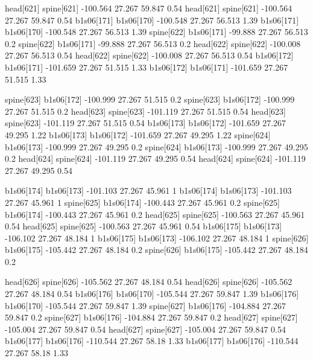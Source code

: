 head[621]    spine[621]    -100.564    27.267    59.847    0.54
head[621]    spine[621]    -100.564    27.267    59.847    0.54
b1s06[171]    b1s06[170]    -100.548    27.267    56.513    1.39
b1s06[171]    b1s06[170]    -100.548    27.267    56.513    1.39
spine[622]    b1s06[171]    -99.888    27.267    56.513    0.2
spine[622]    b1s06[171]    -99.888    27.267    56.513    0.2
head[622]    spine[622]    -100.008    27.267    56.513    0.54
head[622]    spine[622]    -100.008    27.267    56.513    0.54
b1s06[172]    b1s06[171]    -101.659    27.267    51.515    1.33
b1s06[172]    b1s06[171]    -101.659    27.267    51.515    1.33


spine[623]    b1s06[172]    -100.999    27.267    51.515    0.2
spine[623]    b1s06[172]    -100.999    27.267    51.515    0.2
head[623]    spine[623]    -101.119    27.267    51.515    0.54
head[623]    spine[623]    -101.119    27.267    51.515    0.54
b1s06[173]    b1s06[172]    -101.659    27.267    49.295    1.22
b1s06[173]    b1s06[172]    -101.659    27.267    49.295    1.22
spine[624]    b1s06[173]    -100.999    27.267    49.295    0.2
spine[624]    b1s06[173]    -100.999    27.267    49.295    0.2
head[624]    spine[624]    -101.119    27.267    49.295    0.54
head[624]    spine[624]    -101.119    27.267    49.295    0.54


b1s06[174]    b1s06[173]    -101.103    27.267    45.961    1
b1s06[174]    b1s06[173]    -101.103    27.267    45.961    1
spine[625]    b1s06[174]    -100.443    27.267    45.961    0.2
spine[625]    b1s06[174]    -100.443    27.267    45.961    0.2
head[625]    spine[625]    -100.563    27.267    45.961    0.54
head[625]    spine[625]    -100.563    27.267    45.961    0.54
b1s06[175]    b1s06[173]    -106.102    27.267    48.184    1
b1s06[175]    b1s06[173]    -106.102    27.267    48.184    1
spine[626]    b1s06[175]    -105.442    27.267    48.184    0.2
spine[626]    b1s06[175]    -105.442    27.267    48.184    0.2


head[626]    spine[626]    -105.562    27.267    48.184    0.54
head[626]    spine[626]    -105.562    27.267    48.184    0.54
b1s06[176]    b1s06[170]    -105.544    27.267    59.847    1.39
b1s06[176]    b1s06[170]    -105.544    27.267    59.847    1.39
spine[627]    b1s06[176]    -104.884    27.267    59.847    0.2
spine[627]    b1s06[176]    -104.884    27.267    59.847    0.2
head[627]    spine[627]    -105.004    27.267    59.847    0.54
head[627]    spine[627]    -105.004    27.267    59.847    0.54
b1s06[177]    b1s06[176]    -110.544    27.267    58.18    1.33
b1s06[177]    b1s06[176]    -110.544    27.267    58.18    1.33



